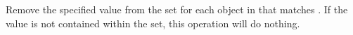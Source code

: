 Remove the specified value from the set for each object in  that
matches .  If the value is not contained within the set, this
operation will do nothing.


